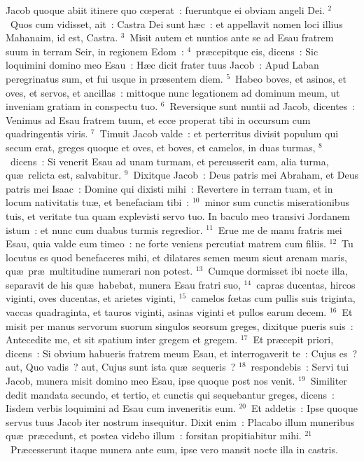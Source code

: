 \lettrine[lines=3,image=true,loversize=0.05,lraise=-0.03]{J}{}acob quoque abiit itinere quo cœperat~: fueruntque ei obviam angeli Dei.
${}^{2}$~Quos cum vidisset, ait~: Castra Dei sunt h\ae c~: et appellavit nomen loci illius Mahanaim, id est, Castra.
${}^{3}$~Misit autem et nuntios ante se ad Esau fratrem suum in terram Seir, in regionem Edom~:
${}^{4}$~pr\ae cepitque eis, dicens~: Sic loquimini domino meo Esau~: H\ae c dicit frater tuus Jacob~: Apud Laban peregrinatus sum, et fui usque in pr\ae sentem diem.
${}^{5}$~Habeo boves, et asinos, et oves, et servos, et ancillas~: mittoque nunc legationem ad dominum meum, ut inveniam gratiam in conspectu tuo.
${}^{6}$~Reversique sunt nuntii ad Jacob, dicentes~: Venimus ad Esau fratrem tuum, et ecce properat tibi in occursum cum quadringentis viris.
${}^{7}$~Timuit Jacob valde~: et perterritus divisit populum qui secum erat, greges quoque et oves, et boves, et camelos, in duas turmas,
${}^{8}$~dicens~: Si venerit Esau ad unam turmam, et percusserit eam, alia turma, qu\ae\ relicta est, salvabitur.
${}^{9}$~Dixitque Jacob~: Deus patris mei Abraham, et Deus patris mei Isaac~: Domine qui dixisti mihi~: Revertere in terram tuam, et in locum nativitatis tu\ae , et benefaciam tibi~:
${}^{10}$~minor sum cunctis miserationibus tuis, et veritate tua quam explevisti servo tuo. In baculo meo transivi Jordanem istum~: et nunc cum duabus turmis regredior.
${}^{11}$~Erue me de manu fratris mei Esau, quia valde eum timeo~: ne forte veniens percutiat matrem cum filiis.
${}^{12}$~Tu locutus es quod benefaceres mihi, et dilatares semen meum sicut arenam maris, qu\ae\ pr\ae\ multitudine numerari non potest.
${}^{13}$~Cumque dormisset ibi nocte illa, separavit de his qu\ae\ habebat, munera Esau fratri suo,
${}^{14}$~capras ducentas, hircos viginti, oves ducentas, et arietes viginti,
${}^{15}$~camelos fœtas cum pullis suis triginta, vaccas quadraginta, et tauros viginti, asinas viginti et pullos earum decem.
${}^{16}$~Et misit per manus servorum suorum singulos seorsum greges, dixitque pueris suis~: Antecedite me, et sit spatium inter gregem et gregem.
${}^{17}$~Et pr\ae cepit priori, dicens~: Si obvium habueris fratrem meum Esau, et interrogaverit te~: Cujus es~? aut, Quo vadis~? aut, Cujus sunt ista qu\ae\ sequeris~?
${}^{18}$~respondebis~: Servi tui Jacob, munera misit domino meo Esau, ipse quoque post nos venit.
${}^{19}$~Similiter dedit mandata secundo, et tertio, et cunctis qui sequebantur greges, dicens~: Iisdem verbis loquimini ad Esau cum inveneritis eum.
${}^{20}$~Et addetis~: Ipse quoque servus tuus Jacob iter nostrum insequitur. Dixit enim~: Placabo illum muneribus qu\ae\ pr\ae cedunt, et postea videbo illum~: forsitan propitiabitur mihi.
${}^{21}$~Pr\ae cesserunt itaque munera ante eum, ipse vero mansit nocte illa in castris.


